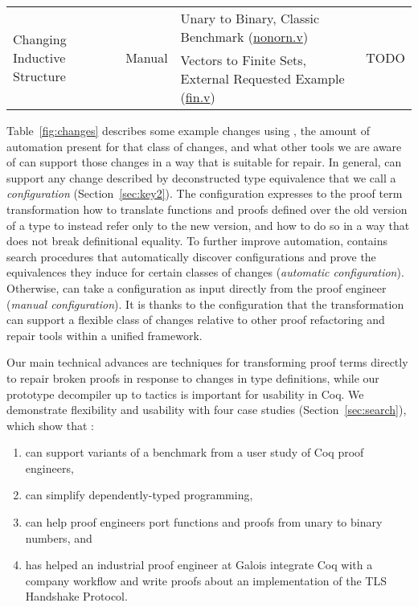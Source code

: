 \begin{figure*}
\begin{tabular}{|l|l|l|l|}
    \hline
    \multirow[t]{2}{*}{Changing Inductive Structure} & \multirow[t]{2}{*}{Manual} & Unary to Binary, Classic Benchmark (\href{https://github.com/uwplse/pumpkin-pi/blob/master/plugin/coq/nonorn.v}{nonorn.v}) & \multirow[t]{2}{*}{TODO}\\
     & & Vectors to Finite Sets, External Requested Example (\href{https://github.com/uwplse/pumpkin-pi/blob/master/plugin/coq/playground/fin.v}{fin.v}) & \\
    \hline
  \end{tabular}
  \caption{Some example changes using \toolname.}
\label{fig:changes}
\end{figure*}

Table~\ref{fig:changes} describes some example changes using \toolname, the amount of automation present for that class of changes,
and what other tools we are aware of can support those changes in a way that is suitable for repair.
In general, \toolname can support any change described by deconstructed type equivalence that we call a \textit{configuration} (Section~\ref{sec:key2}).
The configuration expresses to the proof term transformation how to translate functions and proofs defined over the old version of a type
to instead refer only to the new version, and how to do so in a way that does not break definitional equality.
To further improve automation, \toolname contains search procedures that automatically discover configurations and prove the
equivalences they induce for certain classes of changes (\textit{automatic configuration}).
Otherwise, \toolname can take a configuration as input directly from the proof engineer (\textit{manual configuration}).
It is thanks to the configuration that the \toolname transformation can support a flexible class of changes relative to other proof refactoring and repair tools within a unified framework.

Our main technical advances are techniques for transforming proof terms directly to repair broken proofs in response to changes
in type definitions, while our prototype decompiler up to tactics is important for usability in Coq.
We demonstrate flexibility and usability with four case studies (Section~\ref{sec:search}), which show that \toolname:

\begin{enumerate}
\item can support variants of a benchmark from a user study of Coq proof engineers,
\item can simplify dependently-typed programming, %
\item can help proof engineers port functions and proofs from unary to binary numbers, and
\item has helped an industrial proof engineer at Galois integrate Coq with a company workflow and write proofs about an implementation of the TLS Handshake Protocol.
\end{enumerate}

